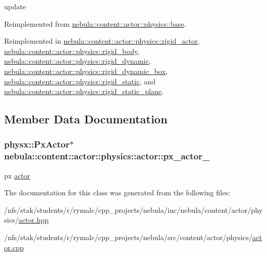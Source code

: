 update 

Reimplemented from \hyperlink{classnebula_1_1content_1_1actor_1_1physics_1_1base_a468da70c6f6c2520b458662ab97b76e5}{nebula::content::actor::physics::base}.

Reimplemented in \hyperlink{classnebula_1_1content_1_1actor_1_1physics_1_1rigid__actor_a9227091110aae435ca13493edd27fe66}{nebula::content::actor::physics::rigid\_\-actor}, \hyperlink{classnebula_1_1content_1_1actor_1_1physics_1_1rigid__body_a7c8c0d4a581a36f3015912d1d73166f6}{nebula::content::actor::physics::rigid\_\-body}, \hyperlink{classnebula_1_1content_1_1actor_1_1physics_1_1rigid__dynamic_a37baf9ed4986782294789073ebb05f19}{nebula::content::actor::physics::rigid\_\-dynamic}, \hyperlink{classnebula_1_1content_1_1actor_1_1physics_1_1rigid__dynamic__box_ac3f90a5c975d090930fb77f5961e7064}{nebula::content::actor::physics::rigid\_\-dynamic\_\-box}, \hyperlink{classnebula_1_1content_1_1actor_1_1physics_1_1rigid__static_a8ecc4b9b308562ab3942bdac5b8ddfea}{nebula::content::actor::physics::rigid\_\-static}, and \hyperlink{classnebula_1_1content_1_1actor_1_1physics_1_1rigid__static__plane_ab42f682ba60457dc596613690b57517e}{nebula::content::actor::physics::rigid\_\-static\_\-plane}.

\subsection{Member Data Documentation}
\hypertarget{classnebula_1_1content_1_1actor_1_1physics_1_1actor_a6085a7feb406d34f35a683e87b728fd0}{
\subsubsection[{px\_\-actor\_\-}]{\setlength{\rightskip}{0pt plus 5cm}physx::PxActor$\ast$ {\bf nebula::content::actor::physics::actor::px\_\-actor\_\-}}}
\label{classnebula_1_1content_1_1actor_1_1physics_1_1actor_a6085a7feb406d34f35a683e87b728fd0}


px \hyperlink{classnebula_1_1content_1_1actor_1_1physics_1_1actor}{actor} 

The documentation for this class was generated from the following files:\begin{DoxyCompactItemize}
\item 
/nfs/stak/students/r/rymalc/cpp\_\-projects/nebula/inc/nebula/content/actor/physics/\hyperlink{physics_2actor_8hpp}{actor.hpp}\item 
/nfs/stak/students/r/rymalc/cpp\_\-projects/nebula/src/content/actor/physics/\hyperlink{physics_2actor_8cpp}{actor.cpp}\end{DoxyCompactItemize}
